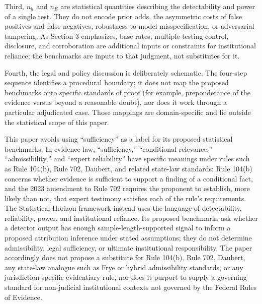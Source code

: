 \documentclass[11pt]{article}
\begin{document}
Third, $n_h$ and $n_E$ are statistical quantities describing the detectability and
power of a single test. They do not encode prior odds, the asymmetric costs of false
positives and false negatives, robustness to model misspecification, or adversarial
tampering. As Section 3 emphasizes, base rates, multiple-testing control, disclosure,
and corroboration are additional inputs or constraints for institutional reliance;
the benchmarks are inputs to that judgment, not substitutes for it.

Fourth, the legal and policy discussion is deliberately schematic. The four-step
sequence identifies a procedural boundary; it does not map the proposed benchmarks
onto specific standards of proof (for example, preponderance of the evidence versus
beyond a reasonable doubt), nor does it work through a particular adjudicated case.
Those mappings are domain-specific and lie outside the statistical scope of this
paper.

This paper avoids using ``sufficiency'' as a label for its proposed statistical
benchmarks. In evidence law, ``sufficiency,'' ``conditional relevance,''
``admissibility,'' and ``expert reliability'' have specific meanings under rules such
as Rule 104(b), Rule 702, Daubert, and related state-law standards: Rule 104(b)
concerns whether evidence is sufficient to support a finding of a conditional fact,
and the 2023 amendment to Rule 702 requires the proponent to establish, more likely
than not, that expert testimony satisfies each of the rule's requirements. The
Statistical Horizon framework instead uses the language of detectability, reliability,
power, and institutional reliance. Its proposed benchmarks ask whether a detector
output has enough sample-length-supported signal to inform a proposed attribution
inference under stated assumptions; they do not determine admissibility, legal
sufficiency, or ultimate institutional responsibility. The paper accordingly does not
propose a substitute for Rule 104(b), Rule 702, Daubert, any state-law analogue such
as Frye or hybrid admissibility standards, or any jurisdiction-specific evidentiary
rule, nor does it purport to supply a governing standard for non-judicial
institutional contexts not governed by the Federal Rules of Evidence.
\end{document}
